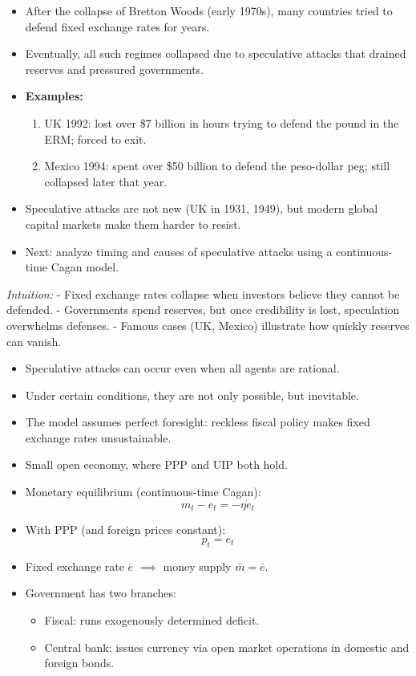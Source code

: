 \documentclass[12pt]{article}
\begin{document}
\begin{itemize}
    \item After the collapse of Bretton Woods (early 1970s), many countries tried to defend fixed exchange rates for years.
    \item Eventually, all such regimes collapsed due to speculative attacks that drained reserves and pressured governments.
    \item \textbf{Examples:}
    \begin{enumerate}
        \item UK 1992: lost over \$7 billion in hours trying to defend the pound in the ERM; forced to exit.
        \item Mexico 1994: spent over \$50 billion to defend the peso-dollar peg; still collapsed later that year.
    \end{enumerate}
    \item Speculative attacks are not new (UK in 1931, 1949), but modern global capital markets make them harder to resist.
    \item Next: analyze timing and causes of speculative attacks using a continuous-time Cagan model.
\end{itemize}

\textit{Intuition:}  
- Fixed exchange rates collapse when investors believe they cannot be defended.  
- Governments spend reserves, but once credibility is lost, speculation overwhelms defenses.  
- Famous cases (UK, Mexico) illustrate how quickly reserves can vanish.  

\begin{itemize}
    \item Speculative attacks can occur even when all agents are rational.
    \item Under certain conditions, they are not only possible, but inevitable.
    \item The model assumes perfect foresight: reckless fiscal policy makes fixed exchange rates unsustainable.
    \item Small open economy, where PPP and UIP both hold.
    \item Monetary equilibrium (continuous-time Cagan):
    \[
        m_t - e_t = -\eta \dot{e}_t
    \]
    \item With PPP (and foreign prices constant):
    \[
        p_t = e_t
    \]
    \item Fixed exchange rate $\bar{e}$ $\implies$ money supply $\bar{m} = \bar{e}$.
    \item Government has two branches:
    \begin{itemize}
        \item Fiscal: runs exogenously determined deficit.
        \item Central bank: issues currency via open market operations in domestic and foreign bonds.
    \end{itemize}
\end{itemize}
\end{document}
